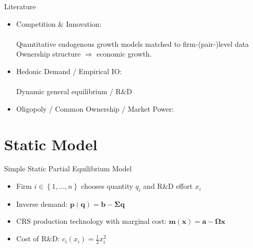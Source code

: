 \documentclass[
  aspectratio=169,  %
  handout           %
]{beamer}
\theoremstyle{plain}
\begin{document}
\begin{frame}{Literature}
  \begin{itemize}
    \item Competition \& Innovation: \\
          {\footnotesize\citet{d-Aspremont1988-je,Aghion2001-yc,Aghion2005-vw,Acemoglu2012-bj,Aghion2013-nq,Bloom2013-pn,Lopez2019-sl,Peters2020-sd,Akcigit2021-ns,Akcigit2023-zl,Liu2022-iw,Cavenaile2023-lo,Anton2023-ej,Anton2024-pw,Kini2024-kd,Hopenhayn2024-ya}}\\
          \textcolor{uclaBlue}{Quantitative endogenous growth models matched to firm-(pair-)level
            data}\\
          \textcolor{uclaBlue}{Ownership structure $\Longrightarrow$ economic growth.}
    \item Hedonic Demand / Empirical IO: \\
          {\footnotesize\citet{Lancaster1966-sg,Rosen1974-ep,Berry1995-lx,Nevo2001-ja,Pellegrino2024-dn,Ederer2024-rw}}\\
          \textcolor{uclaBlue}{Dynamic general equilibrium / R\&D}
    \item Oligopoly / Common Ownership / Market Power: \\
          {\footnotesize\citet{Rubinstein1983-pi,Rotemberg1984-jz,Neary2003-sn,Atkeson2008-zc,Gutierrez2017-wl,He2017-ix,Azar2018-cc,Azar2022-cn,Autor2020-mr,Baqaee2020-eb,De_Loecker2020-jn,Azar2021-uh,Edmond2023-bg}}
  \end{itemize}
\end{frame}

\section{Static Model}

\begin{frame}{Simple Static Partial Equilibrium Model}
  \begin{itemize}
    \item Firm $i\in \left\{1,\ldots, n\right\}$ chooses quantity $q_i$ and R\&D effort $x_i$
          \medskip{}
    \item Inverse demand: $\symbf{p}(\symbf{q}) = \symbf{b} - \symbf{\Sigma} \symbf{q}$\medskip{}
    \item CRS production technology with marginal cost: $\symbf{m}(\symbf{x}) = \symbf{a} - \symbf{\Omega} \symbf{x}$\medskip{}
    \item Cost of R\&D: $c_i(x_i) = \frac{1}{2}x_i^2$
  \end{itemize}
\end{frame}
\end{document}
